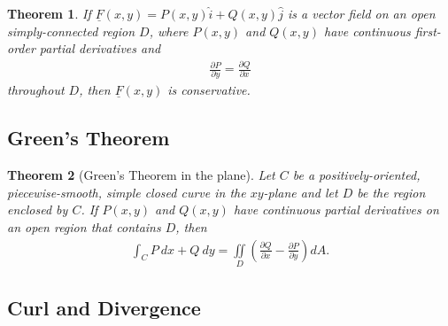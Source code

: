 \documentclass{article}
\theoremstyle{sltheorem}
\newtheorem{theorem}{Theorem}[section]
\newcommand{\ih}{\widehat i}
\newcommand{\jh}{\widehat j}
\newcommand{\di}{\iint\limits}
\renewcommand{\vec}{\underline}
\begin{document}
\begin{theorem}
    If $\vec F(x,y)=P(x,y)\ih + Q(x,y)\jh$ is a vector field on an open simply-connected
    region $D$, where $P(x,y)$ and $Q(x,y)$ have continuous first-order partial
    derivatives and
    \begin{align*}
        \frac{\partial P}{\partial y}=\frac{\partial Q}{\partial x}
    \end{align*}
    throughout $D$, then $\vec F(x,y)$ is conservative.
\end{theorem}
\subsection{Green's Theorem}
\begin{theorem}[Green's Theorem in the plane]
    Let $C$ be a positively-oriented, piecewise-smooth, simple closed curve in
    the $xy$-plane and let $D$ be the region enclosed by $C$. If $P(x,y)$ and
    $Q(x,y)$ have continuous partial derivatives on an open region that contains
    $D$, then
    \begin{align*}
        \int_C P\:dx + Q\:dy = \di_D \left(\frac{\partial Q}{\partial x}-\frac{\partial P}{\partial y}\right)dA.
    \end{align*} 
\end{theorem}
\subsection{Curl and Divergence}
\end{document}
